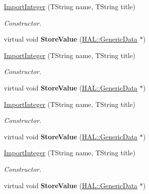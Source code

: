 \begin{DoxyCompactItemize}
\item 
\hyperlink{class_h_a_l_1_1_algorithms_1_1_import_integer_a9dbe511f3ff1a3bf1d9a0de66f08da34}{Import\+Integer} (T\+String name, T\+String title)
\begin{DoxyCompactList}\small\item\em Constructor. \end{DoxyCompactList}\item 
\hypertarget{class_h_a_l_1_1_algorithms_1_1_import_integer_a182865e798de3856a85e4339155b8a7f}{virtual void {\bfseries Store\+Value} (\hyperlink{class_h_a_l_1_1_generic_data}{H\+A\+L\+::\+Generic\+Data} $\ast$)}\label{class_h_a_l_1_1_algorithms_1_1_import_integer_a182865e798de3856a85e4339155b8a7f}

\item 
\hyperlink{class_h_a_l_1_1_algorithms_1_1_import_integer_a9dbe511f3ff1a3bf1d9a0de66f08da34}{Import\+Integer} (T\+String name, T\+String title)
\begin{DoxyCompactList}\small\item\em Constructor. \end{DoxyCompactList}\item 
\hypertarget{class_h_a_l_1_1_algorithms_1_1_import_integer_a182865e798de3856a85e4339155b8a7f}{virtual void {\bfseries Store\+Value} (\hyperlink{class_h_a_l_1_1_generic_data}{H\+A\+L\+::\+Generic\+Data} $\ast$)}\label{class_h_a_l_1_1_algorithms_1_1_import_integer_a182865e798de3856a85e4339155b8a7f}

\item 
\hyperlink{class_h_a_l_1_1_algorithms_1_1_import_integer_a9dbe511f3ff1a3bf1d9a0de66f08da34}{Import\+Integer} (T\+String name, T\+String title)
\begin{DoxyCompactList}\small\item\em Constructor. \end{DoxyCompactList}\item 
\hypertarget{class_h_a_l_1_1_algorithms_1_1_import_integer_a182865e798de3856a85e4339155b8a7f}{virtual void {\bfseries Store\+Value} (\hyperlink{class_h_a_l_1_1_generic_data}{H\+A\+L\+::\+Generic\+Data} $\ast$)}\label{class_h_a_l_1_1_algorithms_1_1_import_integer_a182865e798de3856a85e4339155b8a7f}

\item 
\hyperlink{class_h_a_l_1_1_algorithms_1_1_import_integer_a9dbe511f3ff1a3bf1d9a0de66f08da34}{Import\+Integer} (T\+String name, T\+String title)
\begin{DoxyCompactList}\small\item\em Constructor. \end{DoxyCompactList}\item 
\hypertarget{class_h_a_l_1_1_algorithms_1_1_import_integer_a182865e798de3856a85e4339155b8a7f}{virtual void {\bfseries Store\+Value} (\hyperlink{class_h_a_l_1_1_generic_data}{H\+A\+L\+::\+Generic\+Data} $\ast$)}\label{class_h_a_l_1_1_algorithms_1_1_import_integer_a182865e798de3856a85e4339155b8a7f}


\end{DoxyCompactItemize}
